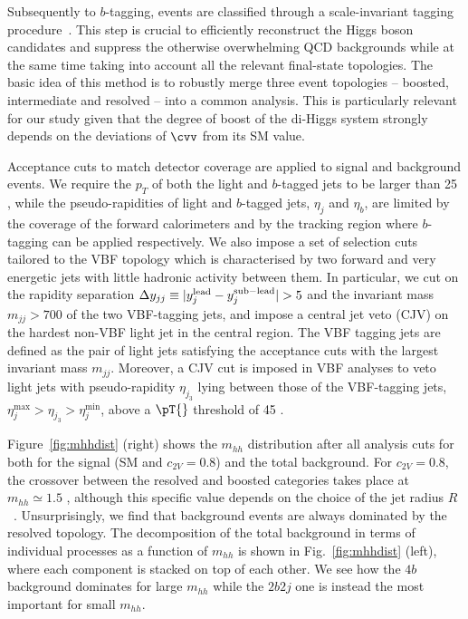 Subsequently to $b$-tagging, events are
classified through a scale-invariant tagging procedure~\cite{Gouzevitch:2013qca,Behr:2015oqq}.
%
This step is crucial to efficiently reconstruct the Higgs boson candidates and
suppress the otherwise overwhelming QCD backgrounds while at the same time
taking into account all the relevant final-state topologies.
%
The basic idea of this method is to robustly merge three event
topologies -- { boosted, intermediate} and { resolved} --
into a common analysis.
%
This is
particularly relevant for our study given that
the degree of boost of the di-Higgs
system strongly depends
on the deviations of $\cvv$ from its SM value.

Acceptance cuts to match detector coverage are applied to signal and background events.
%
We require the $p_T$ of both the light and $b$-tagged jets
to be larger than 25 \UGeV, while 
the pseudo-rapidities of light
and $b$-tagged jets, $\eta_j$
and $\eta_b$, are limited
by the coverage of the forward calorimeters and
by the tracking region where $b$-tagging can be applied
respectively.
%
We also impose a set of selection cuts tailored
to the VBF topology which is characterised by two forward and very energetic
jets with little hadronic activity between them. In particular, we cut on the
rapidity separation $\Delta y_{jj}\equiv|y_j^{\rm lead}-y_j^{\rm sub-lead}|>5$ and
the invariant mass $m_{jj}>700$ \UGeV of the two VBF-tagging jets, and impose a central
jet veto (CJV) on  the hardest non-VBF light jet in the central region. The VBF
tagging jets are defined as the pair of light jets satisfying the acceptance
cuts with the largest invariant mass $m_{jj}$.
%
Moreover, a CJV cut  is imposed  in VBF analyses to veto light
jets with pseudo-rapidity $\eta_{j_3}$ lying between those of the VBF-tagging
jets, $\eta_j^{\max}>\eta_{j_3}>\eta_j^{\min}$, above a $\pT{}$ threshold of 45 \UGeV.

Figure~\ref{fig:mhhdist} (right) shows the $m_{hh}$ distribution
after all analysis cuts for both
for the signal (SM and $c_{2V}=0.8$) and the total background.
%
For $c_{2V}=0.8$, the crossover between the resolved and
boosted categories takes place
at $m_{hh}\simeq 1.5$ \UTeV,
although this specific value depends on the choice of the jet
radius $R$~\cite{Gouzevitch:2013qca}.
%
Unsurprisingly, we find that
background events are always dominated by the resolved topology.
%
The decomposition of the total background in terms of individual processes as a
function of $m_{hh}$ is shown in Fig.~\ref{fig:mhhdist} (left),
where each component is
stacked on top of each other. We see how the $4b$ background dominates
for large $m_{hh}$ while the $2b2j$ one is instead the most important for small
$m_{hh}$. 

